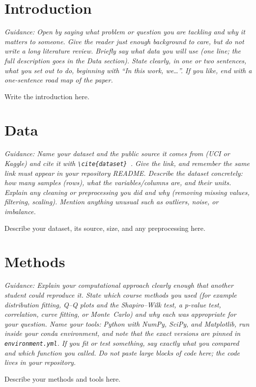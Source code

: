 \documentclass[sigconf,nonacm]{acmart}
\newcommand{\guidance}[1]{\par{\small\color{guide}\textit{Guidance: #1}}\par\medskip}
\begin{document}
\maketitle

\section{Introduction}
\guidance{Open by saying what problem or question you are tackling and why it
matters to someone. Give the reader just enough background to care, but do not
write a long literature review. Briefly say what data you will use (one line;
the full description goes in the Data section). State clearly, in one or two
sentences, what you set out to do, beginning with ``In this work, we\ldots''.
If you like, end with a one-sentence road map of the paper.}
Write the introduction here.

\section{Data}
\guidance{Name your dataset and the public source it comes from (UCI or Kaggle)
and cite it with \texttt{\textbackslash cite\{dataset\}}~\cite{dataset}. Give
the link, and remember the \emph{same} link must appear in your repository
README. Describe the dataset concretely: how many samples (rows), what the
variables/columns are, and their units. Explain any cleaning or preprocessing
you did and why (removing missing values, filtering, scaling). Mention anything
unusual such as outliers, noise, or imbalance.}
Describe your dataset, its source, size, and any preprocessing here.

\section{Methods}
\guidance{Explain your computational approach clearly enough that another
student could reproduce it. State which course methods you used (for example
distribution fitting, Q--Q plots and the Shapiro--Wilk test, a p-value test,
correlation, curve fitting, or Monte~Carlo) and why each was appropriate for
your question. Name your tools: Python with NumPy, SciPy, and Matplotlib, run
inside your conda environment, and note that the exact versions are pinned in
\texttt{environment.yml}. If you fit or test something, say exactly what you
compared and which function you called. Do not paste large blocks of code here;
the code lives in your repository.}
Describe your methods and tools here.
\end{document}

